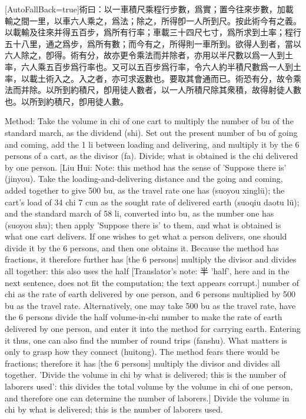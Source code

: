 \documentclass[11pt]{article}
\newcommand{\zhsmall}{\footnotesize\color{black!70}}
\newcommand{\unitlabel}[1]{\marginpar{\raggedleft\tiny\color{gray}#1}}
\newenvironment{unitzh}{\par\CJKfontspec{Noto Serif CJK SC}[AutoFallBack=true]\large\linespread{1.25}\selectfont}{\par}
\newenvironment{uniten}{\par\small\color{black!85}}{\par\medskip}
\begin{document}
\begin{unitzh}\unitlabel{jiuzhang-021.2}術曰：以一車積尺乘程行步數，爲實；置今往來步數，加載輸之間一里，以車六人乘之，爲法；除之，所得卽一人所到尺。{\zhsmall 按此術今有之義。以載輸及往來并得五百步，爲所有行率；車載三十四尺七寸，爲所求到土率；程行五十八里，通之爲步，爲所有數；而今有之，所得則一車所到。欲得人到者，當以六人除之，卽得。術有分，故亦更令乘法而并除者，亦用以半尺數以爲一人到土率，六人乘五百步爲行率也。又可以五百步爲行率，令六人約半積尺數爲一人到土率，以載土術入之。入之者，亦可求返數也。要取其會通而已。術恐有分，故令乘法而并除。以所到約積尺，卽用徒人數者，以一人所積尺除其衆積，故得射徒人數也。}以所到約積尺，卽用徒人數。\end{unitzh}
\begin{uniten}Method: Take the volume in chi of one cart to multiply the number of bu of the standard march, as the dividend (shi). Set out the present number of bu of going and coming, add the 1 li between loading and delivering, and multiply it by the 6 persons of a cart, as the divisor (fa). Divide; what is obtained is the chi delivered by one person. [Liu Hui: Note: this method has the sense of 'Suppose there is' (jinyou). Take the loading-and-delivering distance and the going and coming, added together to give 500 bu, as the travel rate one has (suoyou xinglü); the cart's load of 34 chi 7 cun as the sought rate of delivered earth (suoqiu daotu lü); and the standard march of 58 li, converted into bu, as the number one has (suoyou shu); then apply 'Suppose there is' to them, and what is obtained is what one cart delivers. If one wishes to get what a person delivers, one should divide it by the 6 persons, and then one obtains it. Because the method has fractions, it therefore further has [the 6 persons] multiply the divisor and divides all together: this also uses the half [Translator's note: 半 'half', here and in the next sentence, does not fit the computation; the text appears corrupt.] number of chi as the rate of earth delivered by one person, and 6 persons multiplied by 500 bu as the travel rate. Alternatively, one may take 500 bu as the travel rate, have the 6 persons divide the half volume-in-chi number to make the rate of earth delivered by one person, and enter it into the method for carrying earth. Entering it thus, one can also find the number of round trips (fanshu). What matters is only to grasp how they connect (huitong). The method fears there would be fractions; therefore it has [the 6 persons] multiply the divisor and divides all together. 'Divide the volume in chi by what is delivered; this is the number of laborers used': this divides the total volume by the volume in chi of one person, and therefore one can determine the number of laborers.] Divide the volume in chi by what is delivered; this is the number of laborers used.\end{uniten}
\end{document}
